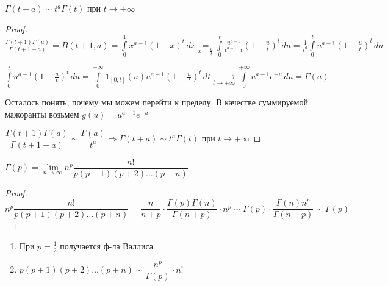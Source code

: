 
\begin{theorem}
	$\Gamma(t+a) \sim t^a \Gamma(t)$ при $t\to +\infty$
\end{theorem}

\begin{proof}\thmslashn
	
	$\frac{\Gamma(t+1)\Gamma(a)}{\Gamma(t+1+a)} = B(t+1, a) = \int\limits_{0}^{1} x^{a-1}(1-x)^{t}\,dx \underset{x = \frac{u}{t}}= \int\limits_{0}^{t} \frac{u^{a-1}}{t^{a-1}\cdot t} \left(1-\frac{u}{t}\right)^{t}\,du = \frac{1}{t^a}\int\limits_{0}^{t} u^{a-1} \left(1-\frac{u}{t}\right)^{t}\,du$
	
	
	$\int\limits_{0}^{t} u^{a-1} \left(1-\frac{u}{t}\right)^{t}\,du = \int\limits_{0}^{+\infty} \mathbf{1}_{[0, t]}(u)u^{a-1}  \left(1-\frac{u}{t}\right)^{t}\,dt \underset{t \to +\infty}\to \int\limits_{0}^{+\infty} u^{a-1}e^{-u}\,du = \Gamma(a)$
	
	Осталось понять, почему мы можем перейти к пределу. В качестве суммируемой мажоранты возьмем $g(u) = u^{a-1}e^{-u}$
	
	$\dfrac{\Gamma(t+1)\Gamma(a)}{\Gamma(t+1+a)} \sim \dfrac{\Gamma(a)}{t^a} \Rightarrow \Gamma(t+a) \sim t^a \Gamma(t)$ при $t\to +\infty$
	
\end{proof}

\begin{theorem}\thmslashn
	
	$\Gamma(p) = \lim\limits_{n \to \infty} n^p \dfrac{n!}{p(p+1)(p+2)\ldots(p+n)}$
	
\end{theorem}

\begin{proof}\thmslashn
	
	$ n^p \dfrac{n!}{p(p+1)(p+2)\ldots(p+n)} = \dfrac{n}{n+p}\cdot \dfrac{\Gamma(p) \Gamma(n)}{\Gamma(n+p)} \cdot n^p \sim \Gamma(p)\cdot \dfrac{\Gamma(n)n^p}{\Gamma(n+p)} \sim \Gamma(p)$
	
	
\end{proof}



\begin{consequence}\thmslashn
	
	\begin{enumerate}
		\item 
		При $p = \frac{1}{2}$ получается ф-ла Валлиса
		
		\item
		$p(p+1)(p+2) \ldots (p+n) \sim \dfrac{n^p}{\Gamma(p)}\cdot n!$
		
	\end{enumerate}
	
\end{consequence}


